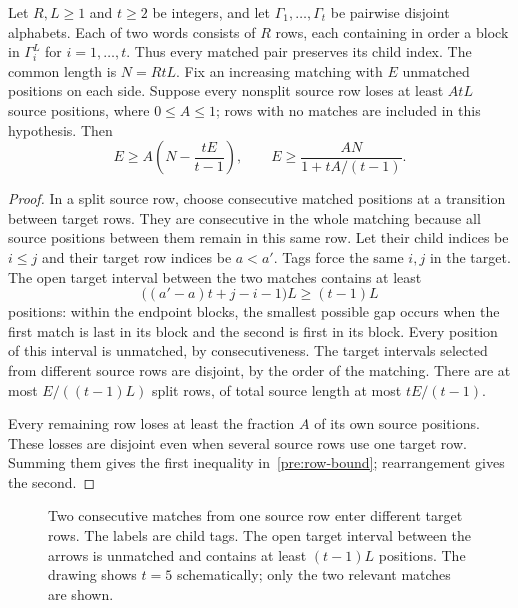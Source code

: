 \begin{lemma}\label{pre:tagged-rows}
Let $R,L\geq1$ and $t\geq2$ be integers, and let
$\Gamma_1,\ldots,\Gamma_t$ be pairwise disjoint alphabets. Each of two words
consists of $R$ rows, each containing in order a block in $\Gamma_i^L$ for
$i=1,\ldots,t$. Thus every matched pair preserves its child index. The
common length is $N=RtL$. Fix an increasing matching with $E$ unmatched positions
on each side. Suppose every nonsplit source row loses at least $AtL$ source
positions, where $0\leq A\leq1$; rows with no matches are included in this
hypothesis. Then
\begin{equation}\label{pre:row-bound}
 E\geq A\left(N-\frac{tE}{t-1}\right),\qquad
 E\geq\frac{AN}{1+tA/(t-1)}.
\end{equation}
\end{lemma}
\begin{proof}
In a split source row, choose consecutive matched positions at a transition
between target rows. They are consecutive in the whole matching because all
source positions between them remain in this same row. Let their child
indices be $i\leq j$ and their target row indices be $a<a'$. Tags force the
same $i,j$ in the target. The open target interval between the two matches
contains at least
\[
 \bigl((a'-a)t+j-i-1\bigr)L\geq(t-1)L
\]
positions: within the endpoint blocks, the smallest possible gap occurs
when the first match is last in its block and the second is first in its
block. Every position of this interval is unmatched, by consecutiveness.
The target intervals selected from different source rows are disjoint, by
the order of the matching. There are at most $E/((t-1)L)$ split rows, of
total source length at most $tE/(t-1)$.

Every remaining row loses at least the fraction $A$ of its own source
positions. These losses are disjoint even when several source rows use one
target row. Summing them gives the first inequality in~\eqref{pre:row-bound};
rearrangement gives the second.
\end{proof}

\begin{figure}[ht]
\centering

\caption{Two consecutive matches from one source row enter different target
rows. The labels are child tags. The open target interval between the arrows
is unmatched and contains at least $(t-1)L$ positions. The drawing shows
$t=5$ schematically; only the two relevant matches are shown.}
\label{fig:split-row}
\end{figure}
